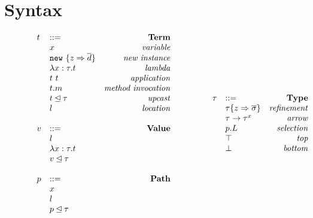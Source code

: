 \documentclass{llncs}
\numberwithin{subcase}{case}
\numberwithin{case}{theorem}
\numberwithin{case}{lemma}
\begin{document}
\section{Syntax}

\begin{figure}[h]
\[
\begin{array}{lllll}
\begin{array}{llr}
t 		& ::= 														&\text{\bf{Term}} \\
		& x 														&\text{\emph{variable}}\\
		& \texttt{new} \ \{z \Rightarrow \overline{d}\}	&\text{\emph{new instance}}\\
		& \lambda x:\tau.t 										&\text{\emph{lambda}}\\
		& t\ t 													&\text{\emph{application}}\\
		& t.m 														&\text{\emph{method invocation}}\\
		& t \unlhd \tau 										&\text{\emph{upcast}}\\
		& l  														&\text{\emph{location}}\\
&&\\
v 		& ::= 														&\text{\bf{Value}} \\
		& l 														&\\
		& \lambda x:\tau.t										&\\
		& v \unlhd \tau 										&\\
&&\\
p 		& ::= 														&\text{\bf{Path}} \\
		& x 														&\\
		& l 														&\\
		& p \unlhd \tau 										&\\
 \end{array}
& ~~~~~~
&
\begin{array}{llr}
\tau 	& ::= 														&\text{\bf{Type}} \\
		& \tau\{z \Rightarrow \overline{\sigma}\}			&\text{\emph{refinement}}\\
		& \tau \rightarrow \tau^x 							&\text{\emph{arrow}}\\
		& p.L 														&\text{\emph{selection}}\\
		& \top 													&\text{\emph{top}}\\
		& \bot 													&\text{\emph{bottom}}\\

\end{array}
\end{array}\]
\end{figure}
\end{document}
